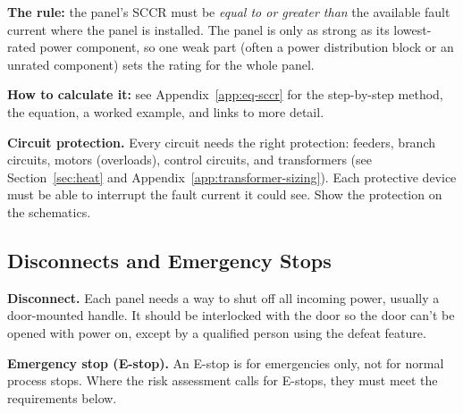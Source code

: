 \textbf{The rule:} the panel's SCCR must be \emph{equal to or greater than} the available fault current where the panel is installed. The panel is only as strong as its lowest-rated power component, so one weak part (often a power distribution block or an unrated component) sets the rating for the whole panel.

\textbf{How to calculate it:} see Appendix~\ref{app:eq-sccr} for the step-by-step method, the equation, a worked example, and links to more detail.

\textbf{Circuit protection.} Every circuit needs the right protection: feeders, branch circuits, motors (overloads), control circuits, and transformers (see Section~\ref{sec:heat} and Appendix~\ref{app:transformer-sizing}). Each protective device must be able to interrupt the fault current it could see. Show the protection on the schematics.

\subsection{Disconnects and Emergency Stops}\label{sec:estop}
\textbf{Disconnect.} Each panel needs a way to shut off all incoming power, usually a door-mounted handle. It should be interlocked with the door so the door can't be opened with power on, except by a qualified person using the defeat feature.

\textbf{Emergency stop (E-stop).} An E-stop is for emergencies only, not for normal process stops. Where the risk assessment calls for E-stops, they must meet the requirements below.

